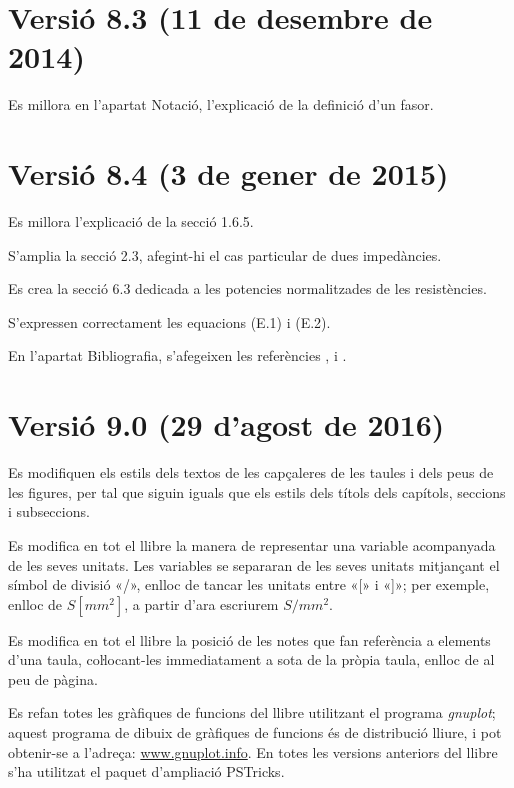 \section*{Versió 8.3 (11 de desembre de 2014)}

Es millora en l'apartat Notació, l'explicació de la definició d'un fasor.


\section*{Versió 8.4 (3 de gener de 2015)}

Es millora l'explicació de la secció 1.6.5.

S'amplia la secció 2.3, afegint-hi el cas particular de dues impedàncies.

Es crea la secció 6.3 dedicada a les potencies normalitzades de les resistències.

S'expressen correctament les equacions (E.1) i (E.2).

En l'apartat Bibliografia, s'afegeixen les referències \cite{AGVS}, \cite{JSch} i \cite{RRop}.


\section*{Versió 9.0 (29 d’agost de 2016)}

Es modifiquen els estils dels textos de les capçaleres de les taules i dels peus de les figures, per tal que siguin iguals que els estils dels títols dels capítols, seccions i subseccions.

Es modifica en tot el llibre la manera de representar una variable acompanyada de les seves unitats. Les variables se separaran de les seves unitats mitjançant el símbol de divisió «/», enlloc de tancar les unitats entre «[» i  «]»; per exemple, enlloc de
$S\unit{[mm^2]}$, a partir d'ara escriurem $S/\si{mm^2}$.

Es modifica en tot el llibre la posició de les notes que fan referència a elements d'una taula, coŀlocant-les immediatament a sota de la pròpia taula, enlloc de al peu de pàgina.

Es refan totes les gràfiques de funcions del llibre utilitzant el programa \emph{gnuplot}; aquest programa de dibuix de gràfiques de funcions és de distribució lliure, i pot obtenir-se a l'adreça: \href{http://www.gnuplot.info/}{www.gnuplot.info}. En totes les versions anteriors del llibre s'ha utilitzat el paquet d'ampliació  PSTricks.

